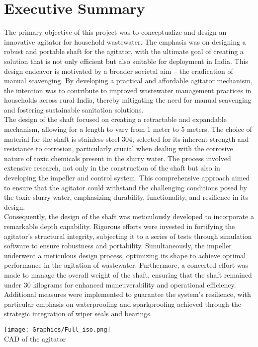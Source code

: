 \documentclass[a4,10pt]{report}
\begin{document}
\section*{Executive Summary}
The primary objective of this project was to conceptualize and design an innovative agitator for household wastewater. The emphasis was on designing a robust and portable shaft for the agitator, with the ultimate goal of creating a solution that is not only efficient but also suitable for deployment in India. This design endeavor is motivated by a broader societal aim – the eradication of manual scavenging. By developing a practical and affordable agitator mechanism, the intention was to contribute to improved wastewater management practices in households across rural India, thereby mitigating the need for manual scavenging and fostering sustainable sanitation solutions.
\vspace{2mm} \\
The design of the shaft focused on creating a retractable and expandable mechanism, allowing for a length to vary from 1 meter to 5 meters. The choice of material for the shaft is stainless steel 304, selected for its inherent strength and resistance to corrosion, particularly crucial when dealing with the corrosive nature of toxic chemicals present in the slurry water. The process involved extensive research, not only in the construction of the shaft but also in developing the impeller and control system. This comprehensive approach aimed to ensure that the agitator could withstand the challenging conditions posed by the toxic slurry water, emphasizing durability, functionality, and resilience in its design.
\vspace{2mm} \\
Consequently, the design of the shaft was meticulously developed to incorporate a remarkable depth capability. Rigorous efforts were invested in fortifying the agitator's structural integrity, subjecting it to a series of tests through simulation software to ensure robustness and portability. Simultaneously, the impeller underwent a meticulous design process, optimizing its shape to achieve optimal performance in the agitation of wastewater. Furthermore, a concerted effort was made to manage the overall weight of the shaft, ensuring that the shaft remained under 30 kilograms for enhanced maneuverability and operational efficiency. Additional measures were implemented to guarantee the system's resilience, with particular emphasis on waterproofing and sparkproofing achieved through the strategic integration of wiper seals and bearings.
\vspace{1cm}
\begin{center}
    \texttt{[image: Graphics/Full\_iso.png]} \\
    \normalsize{CAD of the agitator} 
\end{center}
\end{document}
